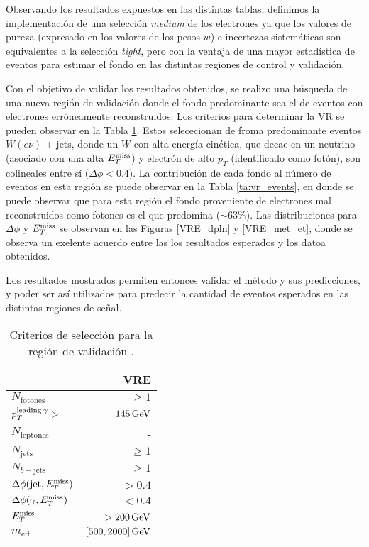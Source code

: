 Observando los resultados expuestos en las distintas tablas, definimos la implementación de una selección \textit{medium} de los electrones ya que los valores de pureza (expresado en los valores de los pesos $w$) e incertezas sistemáticas son equivalentes a la selección \textit{tight}, pero con la ventaja de una mayor estadística de eventos para estimar el fondo en las distintas regiones de control y validación.


Con el objetivo de validar los resultados obtenidos, se realizo una búsqueda de una nueva región de validación donde el fondo predominante sea el de eventos con electrones erróneamente reconstruidos. Los criterios para determinar la VR se pueden observar en la Tabla \ref{ta:vr_crit}. Estos selececionan de froma predominante eventos $W(e\nu)$ + jets, donde un $W$ con alta energía cinética, que decae en un neutrino (asociado con una alta $E_{T}^{\text{miss}}$) y electrón de alto $p_{T}$ (identificado como fotón), son colineales entre sí ($\Delta\phi<0.4$). La contribución de cada fondo al número de eventos en esta región se puede observar en la Tabla \ref{ta:vr_events}, en donde se puede observar que para esta región el fondo proveniente de electrones mal reconstruidos como fotones es el que predomina ($\sim63\%$). Las distribuciones para $\Delta \phi$ y $E_{T}^{\text{miss}}$ se observan en las Figuras \ref{VRE_dphi} y \ref{VRE_met_et}, donde se observa un exelente acuerdo entre las los resultados esperados y los datoa obtenidos.

Los resultados mostrados permiten entonces validar el método y sus predicciones, y poder ser así utilizados para predecir la cantidad de eventos esperados en las distintas regiones de señal.

\begin{table}
\centering
\caption{Criterios de selección para la región de validación \cite{drfran}.}
  \begin{tabular}{l|r}
  \hline
  \hline
  & VRE \\
  \hline
  $N_{\mathrm{fotones}}$                  &       $\ge1$  \\
  $p_{ T}^{\text{leading}\: \gamma} >$         &    $145\, \mathrm{GeV}$  \\
  $N_{\mathrm{leptones}}$                  &           -   \\
  $N_{\mathrm{jets}}$                     &       $\ge1$  \\
  $N_{b-\mathrm{jets}}$                   &       $\ge1$  \\
  $\Delta\phi(\text{jet}, E_{T}^{\text{miss}})$          &       $>0.4$  \\
  $\Delta\phi(\gamma, E_{T}^{\text{miss}})$                &       $<0.4$  \\
  ${E_{T}^{\text{miss}}}$                                &   $>200\, \mathrm{GeV}$  \\
  $m_{\text{eff}}$                               &  $[500, 2000]\, \mathrm{GeV}$  \\
  \hline
  \hline
\end{tabular}
\label{ta:vr_crit}
\end{table}

